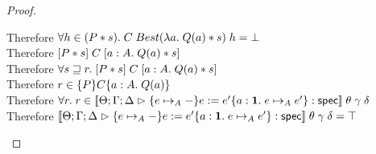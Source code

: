 \begin{proof}
\begin{tabbedproof}
    \ooooo Therefore $\forall h \in (P * s).\; C\;Best(\lambda a.\;Q(a) * s)\;h = \bot$ \\
    \ooooo Therefore $[{P * s}]\;{C}\;[{a:A}.\;{Q(a) * s}]$ \\
    \oooo Therefore $\forall s \sqsupseteq r.\; [{P * s}]\;{C}\;[{a:A}.\;{Q(a) * s}]$ \\
    \oooo Therefore $r \in \{{P}\}{C}\{{a:A}.\;{Q(a)}\}$ \\
    \ooo Therefore $\forall r.\; r \in [\![{{\Theta; \Gamma; \Delta} \vartriangleright {\{{e \mapsto_A -}\}{e := e'}\{{a:\mathbf{1}}.\;{e \mapsto_A e'}\}} : \mathsf{spec}}]\!]\;\theta\;\gamma\;\delta$ \\
    \ooo Therefore $[\![{{\Theta; \Gamma; \Delta} \vartriangleright {\{{e \mapsto_A -}\}{e := e'}\{{a:\mathbf{1}}.\;{e \mapsto_A e'}\}} : \mathsf{spec}}]\!]\;\theta\;\gamma\;\delta = \top$ \\
  \end{tabbedproof}
\end{proof}



